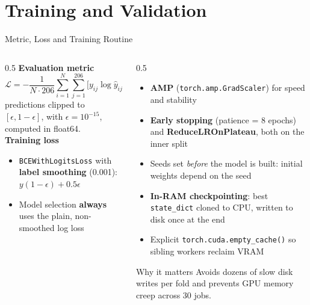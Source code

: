 \documentclass[9pt,aspectratio=169]{beamer}
\begin{document}
\section{Training and Validation}

\begin{frame}{Metric, Loss and Training Routine}
  \begin{columns}[T]
    \begin{column}{0.5\textwidth}
      \textbf{Evaluation metric}
      {\small
      \[
        \mathcal{L} = -\frac{1}{N \cdot 206}\sum_{i=1}^{N}\sum_{j=1}^{206}
        \Big[y_{ij}\log \hat y_{ij} + (1-y_{ij})\log(1-\hat y_{ij})\Big]
      \]}
      predictions clipped to $[\epsilon, 1-\epsilon]$, with $\epsilon = 10^{-15}$, computed in float64.
      \\
      \vspace{4mm}
      \textbf{Training loss}
      \begin{itemize}
        \item \texttt{BCEWithLogitsLoss} with \textbf{label smoothing} (0.001): $y(1-\epsilon) + 0.5\epsilon$
        \item Model selection \textbf{always} uses the plain, non-smoothed log loss
      \end{itemize}
    \end{column}
    \begin{column}{0.5\textwidth}
      \begin{itemize}
        \item \textbf{AMP} (\texttt{torch.amp.GradScaler}) for speed and stability
        \item \textbf{Early stopping} (patience = 8 epochs) and \textbf{ReduceLROnPlateau}, both on the inner split
        \item Seeds set \emph{before} the model is built: initial weights depend on the seed
        \item \textbf{In-RAM checkpointing}: best \texttt{state\_dict} cloned to CPU, written to disk once at the end
        \item Explicit \texttt{torch.cuda.empty\_cache()} so sibling workers reclaim VRAM
      \end{itemize}
      \begin{alertblock}{Why it matters}
        Avoids dozens of slow disk writes per fold and prevents GPU memory creep across 30 jobs.
      \end{alertblock}
    \end{column}
  \end{columns}
\end{frame}
\end{document}
